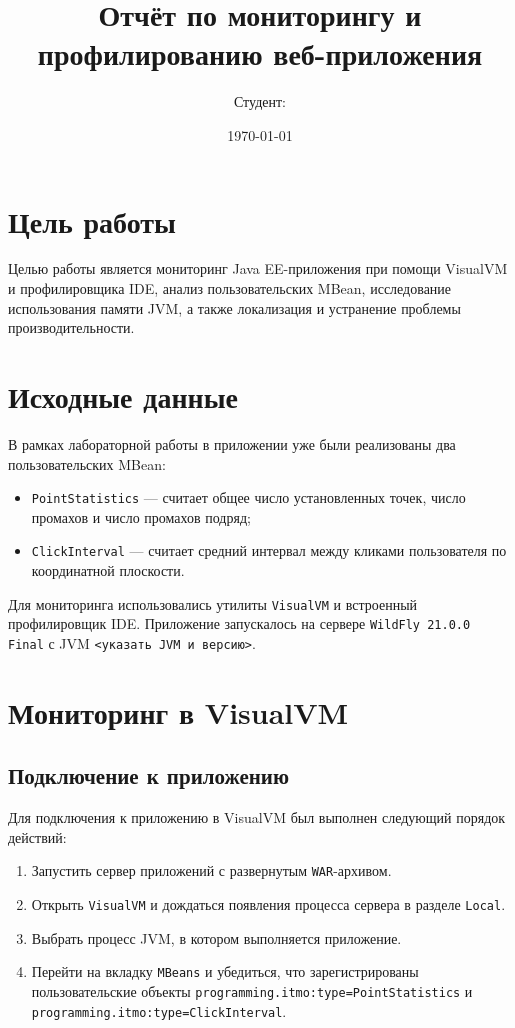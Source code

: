 \documentclass[12pt,a4paper]{article}
\title{Отчёт по мониторингу и профилированию веб-приложения}
\author{Студент: \underline{\hspace{6cm}}}
\date{\today}
\begin{document}
\maketitle

\section{Цель работы}
Целью работы является мониторинг Java EE-приложения при помощи VisualVM и профилировщика IDE, анализ пользовательских MBean, исследование использования памяти JVM, а также локализация и устранение проблемы производительности.

\section{Исходные данные}
В рамках лабораторной работы в приложении уже были реализованы два пользовательских MBean:
\begin{itemize}[leftmargin=*]
    \item \texttt{PointStatistics} --- считает общее число установленных точек, число промахов и число промахов подряд;
    \item \texttt{ClickInterval} --- считает средний интервал между кликами пользователя по координатной плоскости.
\end{itemize}

Для мониторинга использовались утилиты \texttt{VisualVM} и встроенный профилировщик IDE. Приложение запускалось на сервере \texttt{WildFly 21.0.0 Final} с JVM \texttt{<указать JVM и версию>}.

\section{Мониторинг в VisualVM}
\subsection{Подключение к приложению}
Для подключения к приложению в VisualVM был выполнен следующий порядок действий:
\begin{enumerate}[leftmargin=*]
    \item Запустить сервер приложений с развернутым \texttt{WAR}-архивом.
    \item Открыть \texttt{VisualVM} и дождаться появления процесса сервера в разделе \texttt{Local}.
    \item Выбрать процесс JVM, в котором выполняется приложение.
    \item Перейти на вкладку \texttt{MBeans} и убедиться, что зарегистрированы пользовательские объекты \texttt{programming.itmo:type=PointStatistics} и \texttt{programming.itmo:type=ClickInterval}.
\end{enumerate}
\end{document}
